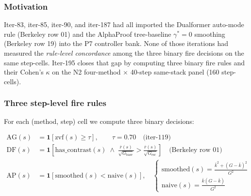 
\subsubsection*{Motivation}

Iter-83, iter-85, iter-90, and iter-187 had all imported the
Dualformer auto-mode rule (Berkeley row 01) and the AlphaProof
tree-baseline $\gamma^*{=}0$ smoothing (Berkeley row 19) into the
P7 controller bank.  None of those iterations had measured the
\emph{rule-level concordance} among the three binary fire decisions
on the same step-cells.  Iter-195 closes that gap by computing
three binary fire rules and their Cohen's $\kappa$ on the N2
four-method $\times$ 40-step same-stack panel (160 step-cells).

\subsubsection*{Three step-level fire rules}

For each (method, step) cell we compute three binary decisions:

\begin{align}
\mathrm{AG}(s) &= \mathbf{1}\!\left[\mathrm{zvf}(s) \ge \tau\right],
\qquad \tau = 0.70 \quad\text{(iter-119)} \\
\mathrm{DF}(s) &= \mathbf{1}\!\left[\mathrm{has\_contrast}(s) \;\wedge\;
\frac{\overline{r}(s)}{\sqrt{G_{\mathrm{base}}}} > \frac{\overline{r}(s)}{\sqrt{G_{\mathrm{esc}}}}\right]
\quad\text{(Berkeley row 01)} \\
\mathrm{AP}(s) &= \mathbf{1}\!\left[\mathrm{smoothed}(s) <
\mathrm{naive}(s)\right], \quad
\begin{cases}
\mathrm{smoothed}(s) = \frac{\bar{k}^2 + (G - \bar{k})^2}{G^2} \\[2pt]
    \mathrm{naive}(s) = \frac{\bar{k}(G - \bar{k})}{G^2}
\end{cases}
\end{align}

